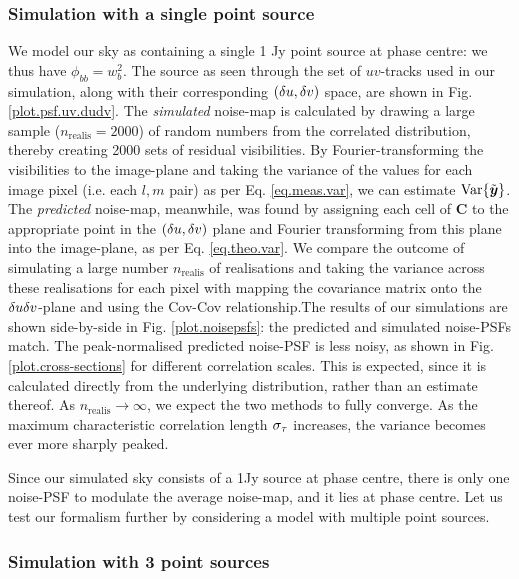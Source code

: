 \subsubsection{Simulation with a single point source}

\pg
We model our sky as containing a single 1 Jy point source at phase centre: we thus have $\phi_{bb}=w_b^2$. The source as seen through the set of $uv$-tracks used in our simulation, along with their corresponding $\left(\delta u,\delta v\right)$ space, are shown in Fig. \ref{plot.psf.uv.dudv}. The \emph{simulated} noise-map is calculated by drawing a large sample ($n_\mathrm{realis}=2000$) of random numbers from the correlated distribution, thereby creating 2000 sets of residual visibilities. By Fourier-transforming the visibilities to the image-plane and taking the variance of the values for each image pixel (i.e. each $l,m$ pair) as per Eq. \ref{eq.meas.var}, we can estimate $\textrm{Var}\{\tilde{\bm{{{y}}}}\}$. The \emph{predicted} noise-map, meanwhile, was found by assigning each cell of $\bm{C}$ to the appropriate point in the $\left(\delta u,\delta v\right)$ plane and Fourier transforming from this plane into the image-plane, as per Eq. \ref{eq.theo.var}.
We compare the outcome of simulating a large number $n_\mathrm{realis}$ of realisations and taking the variance across these realisations for each pixel with mapping the covariance matrix onto the $\delta u\delta v$-plane and using the Cov-Cov relationship.The results of our simulations are shown side-by-side in Fig. \ref{plot.noisepsfs}: the predicted and simulated noise-PSFs match. The peak-normalised predicted noise-PSF is less noisy, as shown in Fig. \ref{plot.cross-sections} for different correlation scales. This is expected, since it is calculated directly from the underlying distribution, rather than an estimate thereof. As $n_\mathrm{realis}\rightarrow\infty$, we expect the two methods to fully converge. As the maximum characteristic correlation length $\sigma_\tau$ increases, the variance becomes ever more sharply peaked.

\pg
{Since our simulated sky consists of a 1Jy source at phase centre, there is only one noise-PSF to modulate the average noise-map, and it lies at phase centre. Let us test our formalism further by considering a model with multiple point sources.}

\subsubsection{Simulation with 3 point sources}

